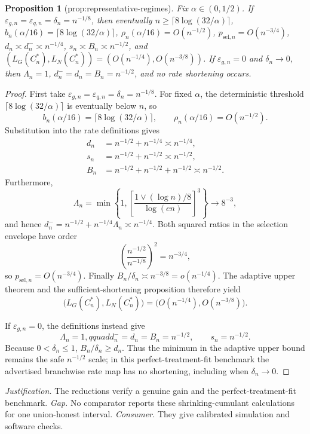 \documentclass{article}
\newtheorem{proposition}{Proposition}
\begin{document}
\begin{proposition}[prop:representative-regimes]\label{prop:representative-regimes}
Fix \(\alpha\in(0,1/2)\). If \(\varepsilon_{g,n}=\varepsilon_{q,n}=\delta_n=n^{-1/8}\), then eventually \(n\ge\lceil8\log(32/\alpha)\rceil\), \(b_n(\alpha/16)=\lceil8\log(32/\alpha)\rceil\), \(\rho_n(\alpha/16)=O(n^{-1/2})\), \(p_{\mathrm{sel},n}=O(n^{-3/4})\), \(d_n\asymp d_n^-\asymp n^{-1/4}\), \(s_n\asymp B_n\asymp n^{-1/2}\), and \((L_G(C_n^*),L_N(C_n^*))=(O(n^{-1/4}),O(n^{-3/8}))\). If \(\varepsilon_{g,n}=0\) and \(\delta_n\to0\), then \(\Lambda_n=1\), \(d_n^-=d_n=B_n=n^{-1/2}\), and no rate shortening occurs.
\end{proposition}
\begin{proof}
First take \(\varepsilon_{g,n}=\varepsilon_{q,n}=\delta_n=n^{-1/8}\).  For fixed \(\alpha\), the deterministic threshold \(\lceil8\log(32/\alpha)\rceil\) is eventually below \(n\), so
\[
b_n(\alpha/16)=\lceil8\log(32/\alpha)\rceil,
\qquad \rho_n(\alpha/16)=O(n^{-1/2}).
\]
Substitution into the rate definitions gives
\[
\begin{aligned}
d_n&=n^{-1/2}+n^{-1/4}\asymp n^{-1/4},\\
s_n&=n^{-1/2}+n^{-1/2}\asymp n^{-1/2},\\
B_n&=n^{-1/2}+n^{-1/2}+n^{-1/2}\asymp n^{-1/2}.
\end{aligned}
\]
Furthermore,
\[
\Lambda_n
=\min\left\{1,
\left[\frac{1\vee(\log n)/8}{\log(en)}\right]^3\right\}
\longrightarrow8^{-3},
\]
and hence \(d_n^-=n^{-1/2}+n^{-1/4}\Lambda_n\asymp n^{-1/4}\).  Both squared ratios in the selection envelope have order
\[
\left(\frac{n^{-1/2}}{n^{-1/8}}\right)^2=n^{-3/4},
\]
so \(p_{\mathrm{sel},n}=O(n^{-3/4})\).  Finally \(B_n/\delta_n\asymp n^{-3/8}=o(n^{-1/4})\).  The adaptive upper theorem and the sufficient-shortening proposition therefore yield
\[
\bigl(L_G(C_n^*),L_N(C_n^*)\bigr)
=\bigl(O(n^{-1/4}),O(n^{-3/8})\bigr).
\]

If \(\varepsilon_{g,n}=0\), the definitions instead give
\[
\Lambda_n=1,qquad
d_n^-=d_n=B_n=n^{-1/2},
\qquad s_n=n^{-1/2}.
\]
Because \(0<\delta_n\le1\), \(B_n/\delta_n\ge d_n\).  Thus the minimum in the adaptive upper bound remains the safe \(n^{-1/2}\) scale; in this perfect-treatment-fit benchmark the advertised branchwise rate map has no shortening, including when \(\delta_n\to0\).
\end{proof}
\par\smallskip\noindent \textit{Justification.} The reductions verify a genuine gain and the perfect-treatment-fit benchmark. \textit{Gap.} No comparator reports these shrinking-cumulant calculations for one union-honest interval. \textit{Consumer.} They give calibrated simulation and software checks.
\end{document}
